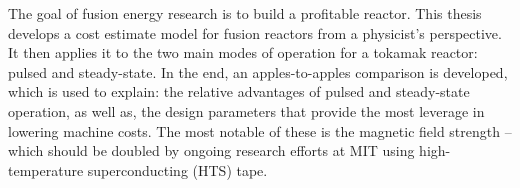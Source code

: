 % 
% 
%
The goal of fusion energy research is to build a profitable reactor. This thesis develops a cost estimate model for fusion reactors from a physicist's perspective. It then applies it to the two main modes of operation for a tokamak reactor: pulsed and steady-state. In the end, an apples-to-apples comparison is developed, which is used to explain: the relative advantages of pulsed and steady-state operation, as well as, the design parameters that provide the most leverage in lowering machine costs. The most notable of these is the magnetic field strength -- which should be doubled by ongoing research efforts at MIT using high-temperature superconducting (HTS) tape.
